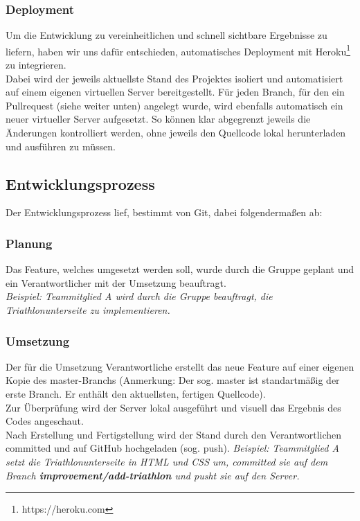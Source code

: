 \documentclass[12pt,a4paper]{article}
\begin{document}
\subsubsection{Deployment}
Um die Entwicklung zu vereinheitlichen und schnell sichtbare Ergebnisse zu liefern, haben wir uns dafür entschieden, automatisches Deployment mit Heroku\footnote{\label{foot:3} https://heroku.com} zu integrieren.\\
Dabei wird der jeweils aktuellste Stand des Projektes isoliert und automatisiert auf einem eigenen virtuellen Server bereitgestellt. Für jeden Branch, für den ein Pullrequest (siehe weiter unten) angelegt wurde, wird ebenfalls automatisch ein neuer virtueller Server aufgesetzt. So können klar abgegrenzt jeweils die Änderungen kontrolliert werden, ohne jeweils den Quellcode lokal herunterladen und ausführen zu müssen.

\subsection{Entwicklungsprozess}
Der Entwicklungsprozess lief, bestimmt von Git, dabei folgendermaßen ab:
\subsubsection{Planung}
Das Feature, welches umgesetzt werden soll, wurde durch die Gruppe geplant und ein Verantwortlicher mit der Umsetzung beauftragt. \\
\emph{Beispiel: Teammitglied A wird durch die Gruppe beauftragt, die Triathlonunterseite zu implementieren.}
\subsubsection{Umsetzung}
Der für die Umsetzung Verantwortliche erstellt das neue Feature auf einer eigenen Kopie des master-Branchs (Anmerkung: Der sog. master ist standartmäßig der erste Branch. Er enthält den aktuellsten, fertigen Quellcode).\\
Zur Überprüfung wird der Server lokal ausgeführt und visuell das Ergebnis des Codes angeschaut.\\
Nach Erstellung und Fertigstellung wird der Stand durch den Verantwortlichen committed und auf GitHub hochgeladen (sog. push). 
\emph{Beispiel: Teammitglied A setzt die Triathlonunterseite in HTML und CSS um, committed sie auf dem Branch \textbf{improvement/add-triathlon} und pusht sie auf den Server.}
\end{document}

